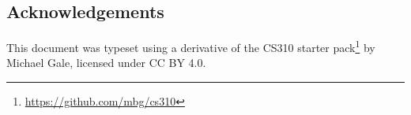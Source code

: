 \documentclass[a4paper,fleqn,12pt]{article}
\begin{document}
\subsection{Acknowledgements}\label{id:h.xqaef57orpsv}
This document was typeset using a derivative of the CS310 starter pack\footnote{\href{https://github.com/mbg/cs310}{https://github.com/mbg/cs310}} by Michael Gale, licensed under CC BY 4.0.










































\end{document}
